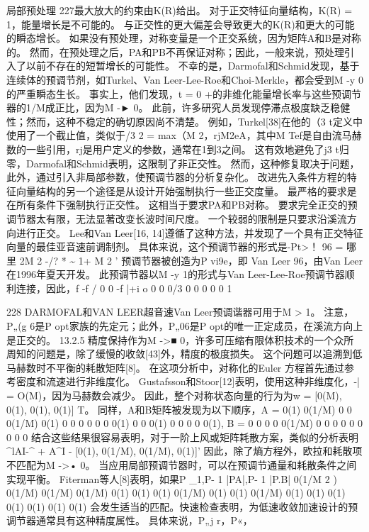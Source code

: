 \documentclass[UTF8,11pt,a4paper,openany,fontset=fandol]{ctexbook}
\begin{document}
局部预处理 227最大放大的约束由K(R)给出。 对于正交特征向量结构，K(R) = 1，能量增长是不可能的。 与正交性的更大偏差会导致更大的K(R)和更大的可能的瞬态增长。 如果没有预处理，对称变量是一个正交系统，因为矩阵A和B是对称的。 然而，在预处理之后，PA和PB不再保证对称；因此，一般来说，预处理引入了以前不存在的短暂增长的可能性。 不幸的是，Darmofal和Schmid发现，基于连续体的预调节剂，如Turkel、Van Leer-Lee-Roe和Choi-Merkle，都会受到M -y 0的严重瞬态生长。 事实上，他们发现，t = 0 +的非维化能量增长率与这些预调节器的1/M成正比，因为M -► 0。 此前，许多研究人员发现停滞点极度缺乏稳健性；然而，这种不稳定的确切原因尚不清楚。 例如，Turkel[38]在他的（3 t定义中使用了一个截止值，类似于/3 2 = max（M 2，rjM2eA，其中M Tef是自由流马赫数的一些引用，rj是用户定义的参数，通常在1到3之间。 这有效地避免了j3 t归零，Darmofal和Schmid表明，这限制了非正交性。 然而，这种修复取决于问题，此外，通过引入非局部参数，使预调节器的分析复杂化。 改进先入条件方程的特征向量结构的另一个途径是从设计开始强制执行一些正交度量。 最严格的要求是在所有条件下强制执行正交性。 这相当于要求PA和PB对称。 要求完全正交的预调节器太有限，无法显著改变长波时间尺度。 一个较弱的限制是只要求沿溪流方向进行正交。 Lee和Van Leer[16, 14]遵循了这种方法，并发现了一个具有正交特征向量的最佳亚音速前调制剂。 具体来说，这个预调节器的形式是-Pt>！ 96 = 哪里 2M 2 -/? * \textasciitilde{} 1+ M 2 ' 预调节器被创造为P vi9e，即 Van Leer 96，由Van Leer在1996年夏天开发。 此预调节器以M -y 1的形式与Van Leer-Lee-Roe预调节器顺利连接，因此，f -f / 0 0 -f |+i o 0 0 0/3 0 0 0 0 0 1

228 DARMOFAL和VAN LEER超音速Van Leer预调谐器可用于M > 1。 注意，P„(g 6是P opt家族的先定元；此外，P„06是P opt的唯一正定成员，在溪流方向上是正交的。 13.2.5 精度保持作为M ->■ 0，许多可压缩有限体积技术的一个众所周知的问题是，除了缓慢的收敛[43]外，精度的极度损失。 这个问题可以追溯到低马赫数时不平衡的耗散矩阵[8]。 在这项分析中，对称化的Euler 方程首先通过参考密度和流速进行非维度化。 Gustafsson和Stoor[12]表明，使用这种非维度化，-| = O(M)，因为马赫数会减少。 因此，整个对称状态向量的行为为w = [0(M), 0(1), 0(1), 0(1)] T。 同样，A和B矩阵被发现为以下顺序，A = 0(1) 0(1/M) 0 0 0(1/M) 0(1) 0 0 0 0 0 0 0(1) 0 0 0(1) 0 0 0 0 0(1), B = 0 0 0 0 0(1/M) 0 0 0 0 0 0 0 0 0 结合这些结果很容易表明，对于一阶上风或矩阵耗散方案，类似的分析表明\textasciicircum{}lAI-\textasciicircum{} + A\textasciicircum{}I - [0(1), 0(1/M), 0(1/M), 0(1)]' 因此，除了熵方程外，欧拉和耗散项不匹配为M ->• 0。 当应用局部预调节器时，可以在预调节通量和耗散条件之间实现平衡。 Fiterman等人[8]表明，如果P \_1,P- 1 |PA|,P- 1 |P.B| 0(1/M 2 ) 0(1/M) 0(1/M) 0(1/M) 0(1) 0(1) 0(1) 0(1/M) 0(1) 0(1) 0(1/M) 0(1) 0(1) 0(1) 0(1) 0(1) 0(1) 0(1) 会发生适当的匹配。快速检查表明，为低速收敛加速设计的预调节器通常具有这种精度属性。 具体来说，P„j r，P«，
\end{document}

